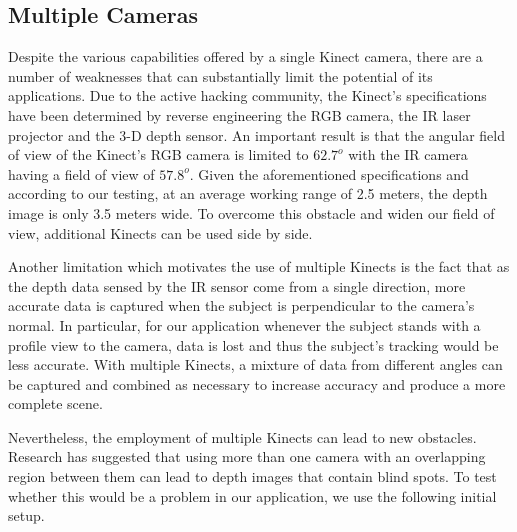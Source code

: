 \documentclass[11pt,a4paper]{article}
\begin{document}
\subsection{Multiple Cameras}
\noindent
Despite the various capabilities offered by a single Kinect camera, there are a number of weaknesses that can substantially limit the potential of its applications. Due to the active hacking community, the Kinect's specifications have been determined by reverse engineering the RGB camera, the IR laser projector and the 3-D depth sensor. An important result is that the angular field of view of the Kinect's RGB camera is limited to $62.7^o$ with the IR camera having a field of view of $57.8^o$. Given the aforementioned specifications and according to our testing, at an average working range of 2.5 meters, the depth image is only 3.5 meters wide. To overcome this obstacle and widen our field of view, additional Kinects can be used side by side. 
 
\noindent
Another limitation which motivates the use of multiple Kinects is the fact that as the depth data sensed by the IR sensor come from a single direction, more accurate data is captured when the subject is perpendicular to the camera's normal. In particular, for our application whenever the subject stands with a profile view to the camera, data is lost and thus the subject's tracking would be less accurate. With multiple Kinects, a mixture of data from different angles can be captured and combined as necessary to increase accuracy and produce a more complete scene.
 
\noindent
Nevertheless, the employment of multiple Kinects can lead to new obstacles. Research has suggested that using more than one camera with an overlapping region between them can lead to depth images that contain blind spots. To test whether this would be a problem in our application, we use the following initial setup.
\end{document}
